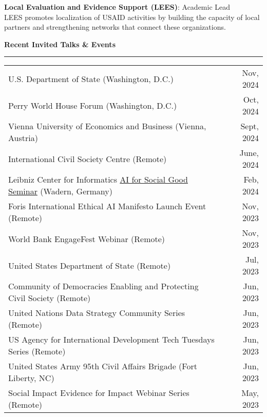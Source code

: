 \documentclass[11pt]{article}
\begin{document}
\textbf{Local Evaluation and Evidence Support (LEES)}: Academic Lead\\
LEES promotes localization of USAID activities by building the capacity of local partners and strengthening networks that connect these organizations.


\bigskip
\textbf{\large Recent Invited Talks \& Events}\\
\rule[3mm]{\textwidth}{.2pt}
\noindent\begin{tabular*}{\textwidth}{@{}l@{\extracolsep{\fill}}r@{}}

U.S. Department of State (Washington, D.C.) & Nov, 2024\\

Perry World House Forum (Washington, D.C.) & Oct, 2024\\

Vienna University of Economics and Business (Vienna, Austria) & Sept, 2024\\

International Civil Society Centre (Remote) & June, 2024\\

Leibniz Center for Informatics \href{https://drops.dagstuhl.de/storage/04dagstuhl-reports/volume14/issue02/24082/DagRep.14.2.182/DagRep.14.2.182.pdf}{AI for Social Good Seminar} (Wadern, Germany) & Feb, 2024\\

Foris International Ethical AI Manifesto Launch Event (Remote) & Nov, 2023\\

World Bank EngageFest Webinar (Remote) & Nov, 2023\\

United States Department of State (Remote) & Jul, 2023\\

Community of Democracies Enabling and Protecting Civil Society (Remote) & Jun, 2023\\

United Nations Data Strategy Community Series (Remote) & Jun, 2023\\

US Agency for International Development Tech Tuesdays Series (Remote) & Jun, 2023\\

United States Army 95th Civil Affairs Brigade (Fort Liberty, NC) & Jun, 2023\\

Social Impact Evidence for Impact Webinar Series (Remote) & May, 2023\\

\end{tabular*}
\end{document}
